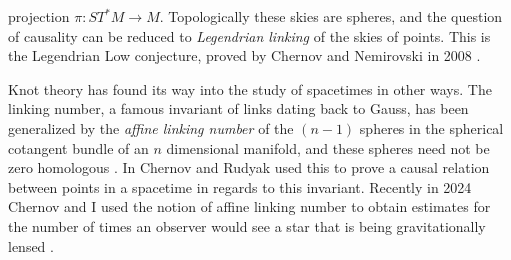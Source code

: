 \documentclass{article}
\begin{document}
        projection $\pi:ST^{*}M\rightarrow{M}$. Topologically these skies are
        spheres, and the question of causality can be reduced to
        \textit{Legendrian linking} of the skies of points. This is the
        Legendrian Low conjecture, proved by Chernov and Nemirovski in 2008
        \cite{ChernovNemirovski2010LowConj}.
        \par\hfill\par
        Knot theory has found its way into the study of spacetimes
        in other ways.
        The linking number, a famous invariant of links dating back to Gauss,
        has been generalized by the \textit{affine linking number} of the
        $(n-1)$ spheres in the spherical cotangent bundle of an $n$ dimensional
        manifold, and these spheres need not be zero homologous
        \cite{ChernovRudyak2003AffineLinkingGeneralTheory}.
        In \cite{ChernovRudyak2002AffineLinkingAndCausality}
        Chernov and Rudyak used this to prove a causal
        relation between points in a spacetime in regards to this invariant.
        Recently in 2024 Chernov and I used the notion of affine linking
        number to obtain estimates for the number of times an observer would
        see a star that is being gravitationally lensed
        \cite{MaguireChernovAffineLinkingNumber}.
\end{document}
